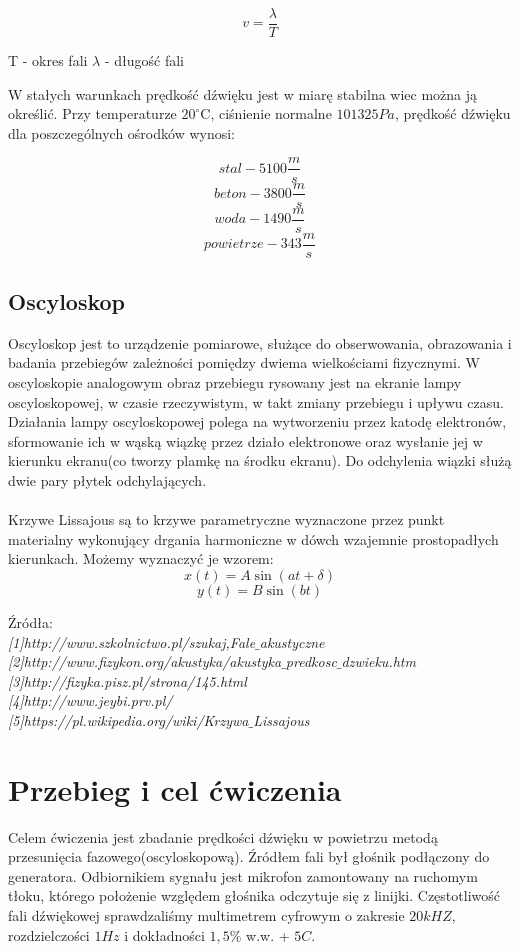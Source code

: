 \documentclass{article}
\begin{document}
$$v = \frac{\lambda}{T}$$
\begin{center}
T - okres fali    $\lambda$ - długość fali
\end{center}
W stałych warunkach prędkość dźwięku jest w miarę stabilna wiec można ją określić. Przy
temperaturze $20^{\circ}$C, ciśnienie normalne $101325 Pa$, prędkość dźwięku dla poszczególnych ośrodków wynosi:

$$stal - 5100 \frac{m}{s}$$
$$beton -  3800 \frac{m}{s}$$
$$woda -  1490 \frac{m}{s}$$
$$powietrze - 343 \frac{m}{s}$$


\subsection{Oscyloskop}
Oscyloskop jest to urządzenie pomiarowe, służące do obserwowania, obrazowania i badania przebiegów zależności pomiędzy dwiema wielkościami fizycznymi. W oscyloskopie analogowym obraz przebiegu rysowany jest na ekranie lampy oscyloskopowej, w czasie rzeczywistym, w takt zmiany przebiegu i upływu czasu. Działania lampy oscyloskopowej polega na wytworzeniu przez katodę elektronów, sformowanie ich w wąską wiązkę przez działo elektronowe oraz wysłanie jej w kierunku ekranu(co tworzy plamkę na środku ekranu). Do odchylenia wiązki służą dwie pary płytek odchylających.\\\\
Krzywe Lissajous są to krzywe parametryczne wyznaczone przez punkt materialny wykonujący drgania harmoniczne w dówch wzajemnie prostopadłych kierunkach. Możemy wyznaczyć je wzorem:
$$x(t) = A\sin (at + \delta)$$
$$y(t) = B\sin (bt)$$
\begin{flushright}
\begin{scriptsize}
Źródła: \\
\textit{[1]http://www.szkolnictwo.pl/szukaj,Fale$\_$akustyczne} \\
\textit{[2]http://www.fizykon.org/akustyka/akustyka$\_$predkosc$\_$dzwieku.htm}\\
\textit{[3]http://fizyka.pisz.pl/strona/145.html}\\
\textit{[4]http://www.jeybi.prv.pl/}\\
\textit{[5]https://pl.wikipedia.org/wiki/Krzywa$\_$Lissajous}\\
\end{scriptsize}
\end{flushright}
\section{Przebieg i cel ćwiczenia}
Celem ćwiczenia jest zbadanie prędkości dźwięku w powietrzu metodą przesunięcia fazowego(oscyloskopową). Źródłem fali był głośnik podłączony do generatora. Odbiornikiem sygnału jest mikrofon zamontowany na ruchomym tłoku, którego położenie względem głośnika odczytuje się z linijki. Częstotliwość fali dźwiękowej sprawdzaliśmy multimetrem cyfrowym o zakresie $20kHZ$, rozdzielczości $1Hz$ i dokładności $1,5\%$ w.w. + $5C$.
\end{document}
